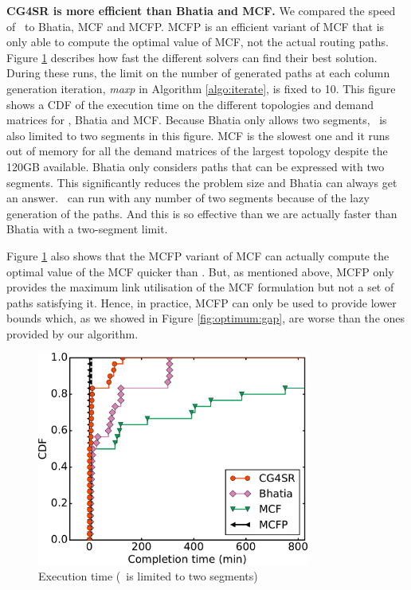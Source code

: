 \textbf{CG4SR is more efficient than Bhatia and MCF.} 
We compared the speed of \name~to Bhatia, MCF and MCFP. MCFP is an efficient variant of MCF that is only able to
compute the optimal value of MCF, not the actual routing paths.
Figure \ref{fig:optimum:time} describes how fast the different solvers can find
their best solution.
During these runs, the limit on the number of generated paths
at each column generation iteration, \textit{maxp} in Algorithm \ref{algo:iterate}, is fixed to 10.
This figure shows a CDF of the execution time on the different topologies and
demand matrices for \name, Bhatia and MCF.
Because Bhatia only allows two segments, \name~is also limited to two segments in this figure.
MCF is the slowest one and it runs out of memory for all the demand matrices
of the largest topology despite the 120GB available.
Bhatia only considers paths that can be expressed with two segments.
This significantly reduces the problem size and Bhatia can always get an answer.
\name~can run with any number of two segments because of the lazy generation of the paths.
And this is so effective than we are actually faster than Bhatia with a two-segment limit.

Figure \ref{fig:optimum:time} also shows that the MCFP variant of MCF
can actually compute the optimal value of the MCF quicker than \name.
But, as mentioned above, MCFP only provides the maximum link
utilisation of the MCF formulation but not a set of paths satisfying it. Hence, in practice, MCFP can
only be used to provide lower bounds which, as we showed in Figure \ref{fig:optimum:gap}, are worse
than the ones provided by our algorithm.


\begin{figure}
\begin{center}
\includegraphics[width=0.8\textwidth]{images/solver_exec_times_inf-2.2016RocketFuelUCL.cdfs.pdf}
\end{center}
\caption{Execution time (\name~is limited to two segments)}
\label{fig:optimum:time}
\end{figure}


